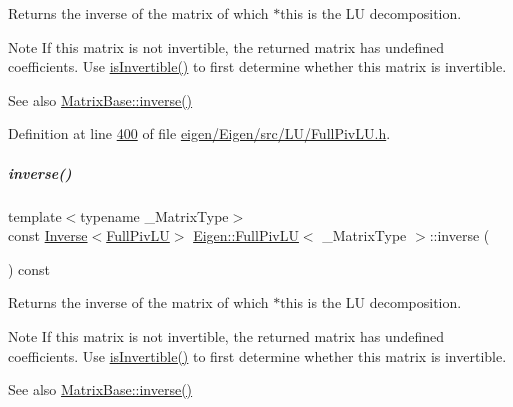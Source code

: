 \begin{DoxyReturn}{Returns}
the inverse of the matrix of which $\ast$this is the LU decomposition.
\end{DoxyReturn}
\begin{DoxyNote}{Note}
If this matrix is not invertible, the returned matrix has undefined coefficients. Use \hyperlink{group___l_u___module_afdf2579c93473650f2ef2a47a376c4a0}{is\+Invertible()} to first determine whether this matrix is invertible.
\end{DoxyNote}
\begin{DoxySeeAlso}{See also}
\hyperlink{group___core___module_a7712eb69e8ea3c8f7b8da1c44dbdeebf}{Matrix\+Base\+::inverse()} 
\end{DoxySeeAlso}


Definition at line \hyperlink{eigen_2_eigen_2src_2_l_u_2_full_piv_l_u_8h_source_l00400}{400} of file \hyperlink{eigen_2_eigen_2src_2_l_u_2_full_piv_l_u_8h_source}{eigen/\+Eigen/src/\+L\+U/\+Full\+Piv\+L\+U.\+h}.

\mbox{\label{group___l_u___module_ae6f4bb55f859f6353f99cf15ecff4b25}} 
\subparagraph{\texorpdfstring{inverse()}{inverse()}\hspace{0.1cm}{\footnotesize\ttfamily [2/2]}}
{\footnotesize\ttfamily template$<$typename \+\_\+\+Matrix\+Type$>$ \\
const \hyperlink{class_eigen_1_1_inverse}{Inverse}$<$\hyperlink{group___l_u___module_class_eigen_1_1_full_piv_l_u}{Full\+Piv\+LU}$>$ \hyperlink{group___l_u___module_class_eigen_1_1_full_piv_l_u}{Eigen\+::\+Full\+Piv\+LU}$<$ \+\_\+\+Matrix\+Type $>$\+::inverse (\begin{DoxyParamCaption}{ }\end{DoxyParamCaption}) const\hspace{0.3cm}{\ttfamily [inline]}}

\begin{DoxyReturn}{Returns}
the inverse of the matrix of which $\ast$this is the LU decomposition.
\end{DoxyReturn}
\begin{DoxyNote}{Note}
If this matrix is not invertible, the returned matrix has undefined coefficients. Use \hyperlink{group___l_u___module_afdf2579c93473650f2ef2a47a376c4a0}{is\+Invertible()} to first determine whether this matrix is invertible.
\end{DoxyNote}
\begin{DoxySeeAlso}{See also}
\hyperlink{group___core___module_a7712eb69e8ea3c8f7b8da1c44dbdeebf}{Matrix\+Base\+::inverse()} 
\end{DoxySeeAlso}


